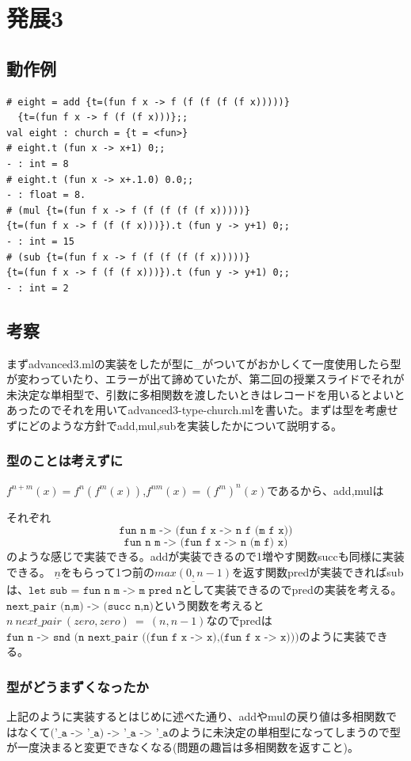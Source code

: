 \documentclass[11pt,a4paper]{jsarticle}
\begin{document}
\section*{発展3}
\subsection*{動作例}
\begin{lstlisting}[basicstyle=\ttfamily\footnotesize, frame=single]
# eight = add {t=(fun f x -> f (f (f (f (f x)))))} 
  {t=(fun f x -> f (f (f x)))};;
val eight : church = {t = <fun>}
# eight.t (fun x -> x+1) 0;;
- : int = 8
# eight.t (fun x -> x+.1.0) 0.0;;
- : float = 8.
# (mul {t=(fun f x -> f (f (f (f (f x)))))} 
{t=(fun f x -> f (f (f x)))}).t (fun y -> y+1) 0;;
- : int = 15
# (sub {t=(fun f x -> f (f (f (f (f x)))))} 
{t=(fun f x -> f (f (f x)))}).t (fun y -> y+1) 0;;
- : int = 2
 \end{lstlisting}
\subsection*{考察}
まずadvanced3.mlの実装をしたが型に\_がついてがおかしくて一度使用したら型が変わっていたり、エラーが出て諦めていたが、第二回の授業スライドでそれが未決定な単相型で、引数に多相関数を渡したいときはレコードを用いるとよいとあったのでそれを用いてadvanced3-type-church.mlを書いた。まずは型を考慮せずにどのような方針でadd,mul,subを実装したかについて説明する。
\subsubsection*{型のことは考えずに}
$f^{n+m}(x)=f^n(f^m(x))$,$f^{nm}(x)=(f^m)^n(x)$であるから、add,mulは \par それぞれ$$\texttt{fun\ n\ m\ ->\ (fun\ f\ x\ ->\ n\ f\ (m\ f\ x))}$$ $$\texttt{fun\ n\ m\ ->\ (fun\ f\ x\ ->\ n\ (m\ f)\ x)}$$のような感じで実装できる。addが実装できるので1増やす関数succも同様に実装できる。
$\underline{n}$をもらって1つ前の$\underline{max(0,n-1)}$を返す関数predが実装できればsubは、$\texttt{let\ sub\ =\ fun\ n\ m\ ->\ m\ pred\ n}$として実装できるのでpredの実装を考える。$\texttt{next\_pair (n,m) -> (succ n,n)}$という関数を考えると$n\ next\_pair\ (zero,zero)\ =\ (n,n-1)$なのでpredは$\texttt{fun n -> snd (n next\_pair ((fun f x -> x),(fun f x -> x)))}$のように実装できる。
\subsubsection*{型がどうまずくなったか}
上記のように実装するとはじめに述べた通り、addやmulの戻り値は多相関数ではなくて$\texttt{('\_a\ ->\ '\_a)\ ->\ '\_a\ ->\ '\_a}$のように未決定の単相型になってしまうので型が一度決まると変更できなくなる(問題の趣旨は多相関数を返すこと)。
\end{document}
